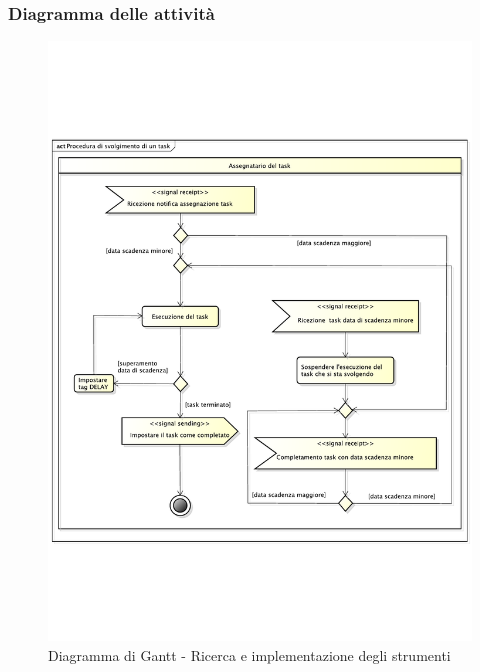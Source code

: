 		\subsubsection{Diagramma delle attività} %
		\label{ssub:diagramma_delle_attivita}
			\begin{figure}[htbp]
				\centering
				\includegraphics[width=14cm]{images/proc_svolgimento_task.pdf}
				\caption{Diagramma di Gantt - Ricerca e implementazione degli strumenti}
				\label{fig:gantt_ricerca_e_implementazione_strumenti}				
			\end{figure}
	
